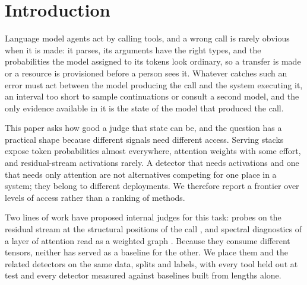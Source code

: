 \section{Introduction}
\label{sec:intro}

Language model agents act by calling tools, and a wrong call is rarely obvious when it is made: it parses,
its arguments have the right types, and the probabilities the model assigned to its tokens look ordinary, so
a transfer is made or a resource is provisioned before a person sees it. Whatever catches such an error must
act between the model producing the call and the system executing it, an interval too short to sample
continuations or consult a second model, and the only evidence available in it is the state of the model
that produced the call.

This paper asks how good a judge that state can be, and the question has a practical shape because
different signals need different access. Serving stacks expose token probabilities almost everywhere,
attention weights with some effort, and residual-stream activations rarely. A detector that needs
activations and one that needs only attention are not alternatives competing for one place in a system;
they belong to different deployments. We therefore report a frontier over levels of access rather than a
ranking of methods.

Two lines of work have proposed internal judges for this task: probes on the residual stream at the
structural positions of the call \citep{healy2026internal}, and spectral diagnostics of a layer of attention
read as a weighted graph \citep{noel2025gsp,binkowski2025lapeigvals}. Because they consume different tensors,
neither has served as a baseline for the other. We place them and the related detectors on the same data,
splits and labels, with every tool held out at test and every detector measured against baselines built from
lengths alone.

